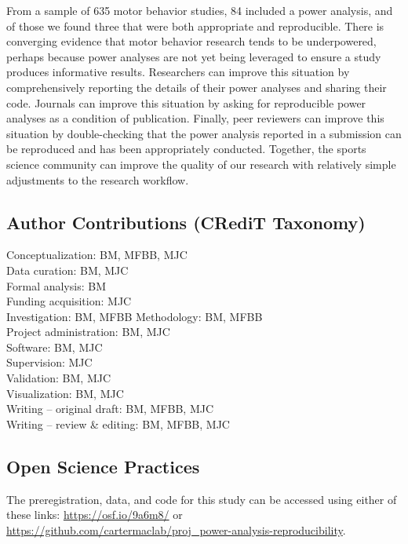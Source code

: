 \documentclass[
  doc, donotrepeattitle,floatsintext]{apa7}
\begin{document}
From a sample of 635 motor behavior studies, 84 included a power analysis, and of those we found three that were both appropriate and reproducible. There is converging evidence that motor behavior research tends to be underpowered, perhaps because power analyses are not yet being leveraged to ensure a study produces informative results. Researchers can improve this situation by comprehensively reporting the details of their power analyses and sharing their code. Journals can improve this situation by asking for reproducible power analyses as a condition of publication. Finally, peer reviewers can improve this situation by double-checking that the power analysis reported in a submission can be reproduced and has been appropriately conducted. Together, the sports science community can improve the quality of our research with relatively simple adjustments to the research workflow.

\vspace{5ex}

\hypertarget{author-contributions-credit-taxonomy}{%
\subsection{Author Contributions (CRediT Taxonomy)}\label{author-contributions-credit-taxonomy}}

\noindent Conceptualization: BM, MFBB, MJC\\
Data curation: BM, MJC\\
Formal analysis: BM\\
Funding acquisition: MJC\\
Investigation: BM, MFBB
Methodology: BM, MFBB\\
Project administration: BM, MJC\\
Software: BM, MJC\\
Supervision: MJC\\
Validation: BM, MJC\\
Visualization: BM, MJC\\
Writing -- original draft: BM, MFBB, MJC\\
Writing -- review \& editing: BM, MFBB, MJC

\hypertarget{open-science-practices}{%
\subsection{Open Science Practices}\label{open-science-practices}}

\noindent The preregistration, data, and code for this study can be accessed using either of these links: \url{https://osf.io/9a6m8/} or \url{https://github.com/cartermaclab/proj_power-analysis-reproducibility}.
\end{document}
